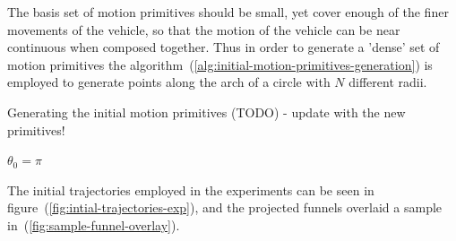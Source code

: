 The basis set of motion primitives should be small, yet cover enough of the
finer movements of the vehicle, so that the motion of the vehicle can be near
continuous when composed together. Thus in order to generate a 'dense' set of
motion primitives the algorithm~(\ref{alg:initial-motion-primitives-generation})
is employed to generate points along the arch of a circle with \(N\) different
radii.


\begin{algorithm}[H]
  \label{alg:initial-motion-primitives-generation}
  \caption{Generating the initial motion primitives (TODO) - update with the new
    primitives!}
  \DontPrintSemicolon \SetAlgoNoLine

   

  \(\theta_{0} = \pi\) \;

  \;
\end{algorithm}

The initial trajectories employed in the experiments can be seen in
figure~(\ref{fig:intial-trajectories-exp}), and the projected funnels overlaid a
sample in~(\ref{fig:sample-funnel-overlay}).

